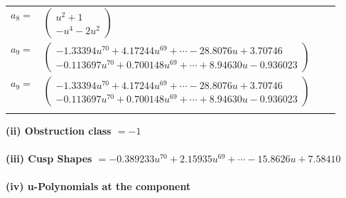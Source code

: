 \documentclass[1p]{elsarticle_modified}
\theoremstyle{definition}
\begin{document}
\begin{tabular}{m{7pt} m{180pt} m{7pt} m{180pt} }
\flushright $a_{8}=$&$\begin{pmatrix}u^2+1\\- u^4-2 u^2\end{pmatrix}$ \\
\flushright $a_{9}=$&$\begin{pmatrix}-1.33394 u^{70}+4.17244 u^{69}+\cdots-28.8076 u+3.70746\\-0.113697 u^{70}+0.700148 u^{69}+\cdots+8.94630 u-0.936023\end{pmatrix}$\\ \flushright $a_{9}=$&$\begin{pmatrix}-1.33394 u^{70}+4.17244 u^{69}+\cdots-28.8076 u+3.70746\\-0.113697 u^{70}+0.700148 u^{69}+\cdots+8.94630 u-0.936023\end{pmatrix}$\\&\end{tabular}
\flushleft \textbf{(ii) Obstruction class $= -1$}\\~\\
\flushleft \textbf{(iii) Cusp Shapes $= -0.389233 u^{70}+2.15935 u^{69}+\cdots-15.8626 u+7.58410$}\\~\\
\newpage\renewcommand{\arraystretch}{1}
\flushleft \textbf{(iv) u-Polynomials at the component}\newline \\
\end{document}
